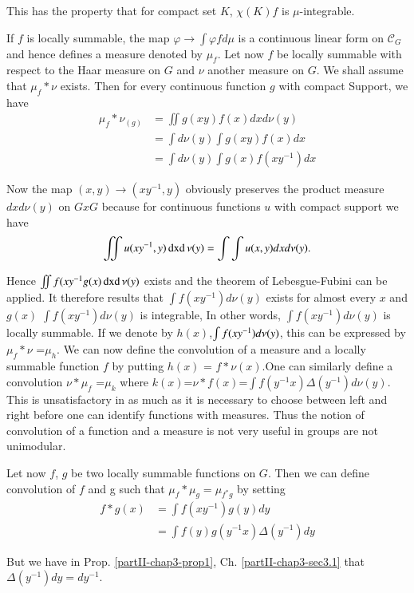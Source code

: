 This has the property that for compact set $K$, $\chi (K)f$ is
$\mu$-integrable. 

If $f$ is locally summable, the map $\varphi\rightarrow\int \varphi fd
\mu$ is a continuous linear form on $\mathscr{C}_{G}$ and hence
defines a measure denoted by $\mu_{f}$. Let now $f$ be locally
summable with respect to the Haar measure on $G$ and $\nu$
another\pageoriginale 
measure on $G$. We shall assume that $\mu_{f}*\nu$ exists. Then for
every continuous function $g$ with compact Support, we have 
\begin{align*}
\mu_{f}*\nu_{(g)}&= \iint g(xy)f(x) dx d\nu (y)\\
&=\int d \nu (y)\int g(xy) f (x)dx\\
&=\int d \nu (y) \int g (x)f (xy^{-1}) dx
\end{align*}

Now the map $(x,y)\rightarrow (xy^{-1},y)$ obviously preserves the
product measure $dx d \nu(y)$ on $G x G$ because for continuous
functions $u$ with compact support we have 
$$
\iint u (xy^{-1},y )\operatorname{dxd} \nu (y)= \int \int u (x,y) dxd\nu (y).
$$

Hence $\iint f(xy^{-1} g(x)\operatorname{dxd} \nu (y)$ exists and the theorem of
Lebesgue-Fubini can  be applied. It therefore results that $\int
f(xy^{-1})d \nu (y)$ exists for almost every $x$ and $g(x)$ $\int f
(xy^{-1})d \nu (y)$ is integrable, In other words,  $\int f (xy^{-1})d
\nu (y)$ is locally summable. If we denote by $h(x)$,$\int f
(xy^{-1})d\nu\break (y)$, this can be expressed by $\mu_{f}*\nu$ 
=$\mu_{h}$. We can now define the convolution of a measure and a
locally summable function $f$ by putting $h(x)$ = $f*\nu (x)$.One can
similarly define a convolution $\nu * \mu_{f}$  
=$\mu_{k}$ where $k(x)$=$\nu*f(x)$=$\int f(y^{-1}x) \Delta 
(y^{-1})d \nu (y)$. This is unsatisfactory in as much as it is necessary
to choose between left and right before one can identify functions
with measures. Thus the notion of convolution of a function and a
measure is not very useful in groups are not unimodular. 


Let now $f$, $g$ be two locally summable functions on $G$. Then we can
define convolution of $f$ and g such that
$\mu_{f} * \mu_{g} = \mu_{f^*g}$  by setting  
\begin{align*}
f*g(x)&=\int f(xy^{-1})g (y) dy\\
&=\int f(y)g (y^{-1}x) \Delta  (y^{-1})dy
\end{align*} 


But we have in Prop. \ref{partII-chap3-prop1},
Ch. \ref{partII-chap3-sec3.1} that $\Delta  (y^{-1})dy=dy^{-1}$.   

